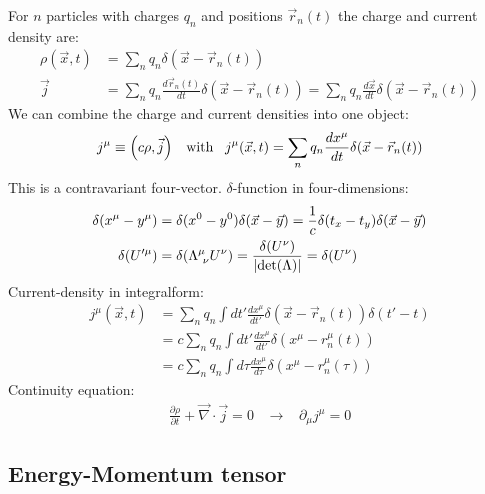 For $n$ particles with charges $q_n$ and positions $\vec{r}_n (t)$ the
charge and current density are:
\begin{align*}
    \rho(\vec{x},t) &= \sum_n q_n \delta(\vec{x} - \vec{r}_n (t))
    \\
    \vec{j} &= \sum_n q_n \frac{d \vec{r}_n (t)}{dt} \delta(\vec{x} - \vec{r}_n (t))
    = \sum_n q_n \frac{d \vec{x}}{dt} \delta(\vec{x} - \vec{r}_n (t))
\end{align*}
We can combine the charge and current densities into one object:
\begin{align*}
    j^\mu \equiv \left( c \rho , \vec{j} \right)
    \hspace{5pt} \text{ with } \hspace{5pt}
    j^\mu (\vec{x},t) = \sum_n q_n \frac{d x^\mu}{dt} \delta(\vec{x} - \vec{r}_n (t))
\end{align*}
This is a contravariant four-vector. $\delta$-function in four-dimensions:
\begin{align*}
    \delta(x^\mu - y^\mu) &= \delta(x^0 - y^0) \delta(\vec{x} - \vec{y})
    = \frac{1}{c} \delta(t_x - t_y) \delta(\vec{x} - \vec{y})
    \\
    \delta(U'^\mu) &= \delta(\Lambda^\mu_{\ \nu} U^\nu) = \frac{\delta(U^\nu)}{\left\vert \det(\Lambda) \right\vert}
    = \delta(U^\nu)
\end{align*}
Current-density in integralform:
\begin{align*}
    j^\mu (\vec{x},t) &= \sum_n q_n \int dt' \frac{dx^\mu}{dt'} \delta(\vec{x} - \vec{r}_n(t)) \delta(t' - t)
    \\
    &= c \sum_n q_n \int dt' \frac{dx^\mu}{dt'} \delta(x^\mu - r^\mu_n (t))
    \\
    &= c \sum_n q_n \int d \tau \frac{dx^\mu}{d \tau} \delta(x^\mu - r_n^\mu (\tau))
\end{align*}
Continuity equation:
\begin{align*}
    \frac{\partial \rho}{\partial t} + \vec{\nabla} \cdot \vec{j} = 0
    \hspace{10pt} \rightarrow \hspace{10pt}
    \partial_\mu j^\mu = 0
\end{align*}

\subsection{Energy-Momentum tensor}

